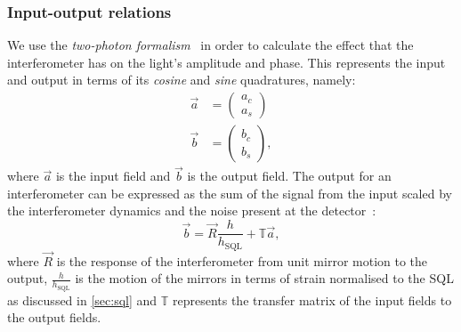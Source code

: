 \subsubsection{Input-output relations}
We use the \emph{two-photon formalism}~\cite{Caves1985, Schumaker1985} in order to calculate the effect that the interferometer has on the light's amplitude and phase. This represents the input and output in terms of its \emph{cosine} and \emph{sine} quadratures, namely:
\begin{align}
  \vec{a} &=
  \begin{pmatrix}
    a_c \\
    a_s
  \end{pmatrix} \\
  \vec{b} &=
  \begin{pmatrix}
    b_c \\
    b_s
  \end{pmatrix},
\end{align}
where $\vec{a}$ is the input field and $\vec{b}$ is the output field. The output for an interferometer can be expressed as the sum of the signal from the input scaled by the interferometer dynamics and the noise present at the detector~\cite{Danilishin2015}:
\begin{equation}
  \label{eq:ifo-output-signal}
  \vec{b} = \vec{R} \frac{h}{h_{\text{SQL}}} + \mathbb{T} \vec{a},
\end{equation}
where $\vec{R}$ is the response of the interferometer from unit mirror motion to the output, $\frac{h}{h_{\text{SQL}}}$ is the motion of the mirrors in terms of strain normalised to the \gls{SQL} as discussed in \cref{sec:sql} and $\mathbb{T}$ represents the transfer matrix of the input fields to the output fields.

